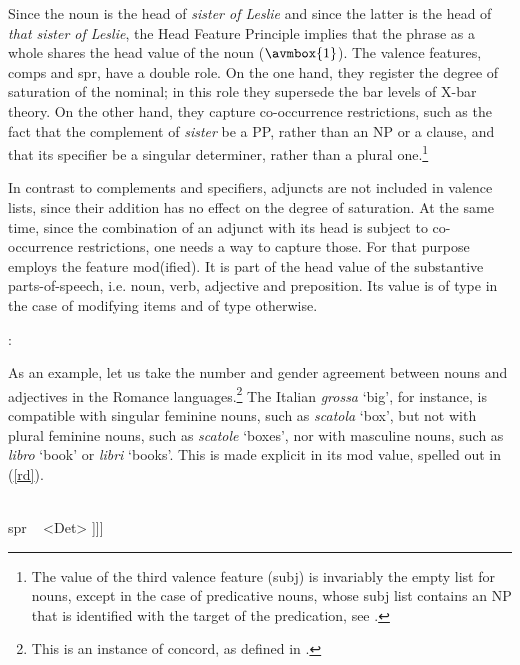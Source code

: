\documentclass[output=paper]{langsci/langscibook}
\begin{document}
Since the noun is the head of \emph{sister of Leslie} and since the latter is 
the head of \emph{that sister of Leslie}, the Head Feature Principle implies 
that the phrase as a whole shares the {\sc head} value of the noun ($\avmbox{1}$). 
The valence features, {\sc comps} and {\sc spr}, have a double role. 
On the one hand, they register the degree of saturation of the nominal; 
in this role they supersede the bar levels of X-bar theory. 
On the other hand, they capture co-occurrence restrictions, 
such as the fact that the complement of \emph{sister} be a PP, rather than an NP or a clause, 
and that its specifier be a singular determiner, rather than a plural one.\footnote{The 
value of the third valence feature ({\sc subj}) is invariably the empty list for nouns, 
except in the case of predicative nouns, whose {\sc subj} list contains an NP 
that is identified with the target of the predication, see \citet[409]{GS00}.}

In contrast to complements and specifiers, adjuncts are not included in valence lists, 
since their addition has no effect on the degree of saturation. At the same time, 
since the combination of an adjunct with its head is subject to 
co-occurrence restrictions, one needs a way to capture those. 
For that purpose \citet[55--57]{ps2} employs the feature {\sc mod(ified)}. 
It is part of the {\sc head} value of the substantive parts-of-speech, 
i.e. noun, verb, adjective and preposition. Its value is of type  
in the case of modifying items and of type  otherwise.

\begin{exe} 
\ex   {}: \begin{avm} 
                          \end{avm} 
\end{exe} 

\noindent
As an example, let us take the number and gender agreement 
between nouns and adjectives in the Romance languages.\footnote{This is an 
instance of concord, as defined in .}  
The Italian \emph{grossa} `big', for instance, 
is compatible with singular feminine nouns, such as \emph{scatola} `box', 
but not with plural feminine nouns, such as \emph{scatole} `boxes', nor
with masculine nouns, such as \emph{libro} `book' or \emph{libri} `books'. 
This is made explicit in its {\sc mod} value, spelled out in (\ref{rd}). 

\begin{exe} 
\ex\label{rd}
\begin{avm}
[\type{category}                              \\
 head [\type{adjective}                         \\
       mod|loc|cat [head [\type{noun}          \\
                          number ~ \type{sing} \\
                          gender ~ \type{fem}] \\
                    spr ~ <Det> ]]]
\end{avm}
\end{exe}
\end{document}
